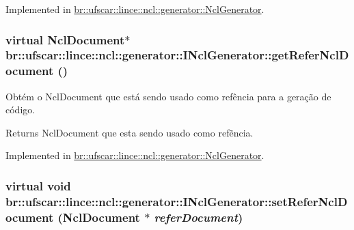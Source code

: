 Implemented in \hyperlink{classbr_1_1ufscar_1_1lince_1_1ncl_1_1generator_1_1NclGenerator_a59b182d92c713dce65071b9a9c391c5f}{br::ufscar::lince::ncl::generator::NclGenerator}.

\hypertarget{classbr_1_1ufscar_1_1lince_1_1ncl_1_1generator_1_1INclGenerator_ae351bae817561b66e20e5442d49a17e0}{
\subsubsection[{getReferNclDocument}]{\setlength{\rightskip}{0pt plus 5cm}virtual NclDocument$\ast$ br::ufscar::lince::ncl::generator::INclGenerator::getReferNclDocument ()}}
\label{classbr_1_1ufscar_1_1lince_1_1ncl_1_1generator_1_1INclGenerator_ae351bae817561b66e20e5442d49a17e0}


Obtém o NclDocument que está sendo usado como refência para a geração de código. 

\begin{DoxyReturn}{Returns}
NclDocument que esta sendo usado como refẽncia. 
\end{DoxyReturn}


Implemented in \hyperlink{classbr_1_1ufscar_1_1lince_1_1ncl_1_1generator_1_1NclGenerator_ab8447127e8b36e07f83995e4a0867596}{br::ufscar::lince::ncl::generator::NclGenerator}.

\hypertarget{classbr_1_1ufscar_1_1lince_1_1ncl_1_1generator_1_1INclGenerator_aa6efc869c5838051c86741ce73babe4e}{
\subsubsection[{setReferNclDocument}]{\setlength{\rightskip}{0pt plus 5cm}virtual void br::ufscar::lince::ncl::generator::INclGenerator::setReferNclDocument (NclDocument $\ast$ {\em referDocument})}}
\label{classbr_1_1ufscar_1_1lince_1_1ncl_1_1generator_1_1INclGenerator_aa6efc869c5838051c86741ce73babe4e}


